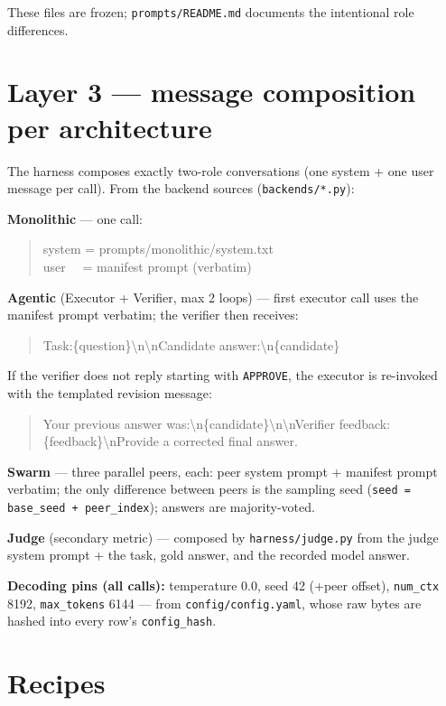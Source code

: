 \documentclass[11pt]{article}
\newcommand{\field}[1]{\texttt{#1}}
\begin{document}
These files are frozen; \texttt{prompts/README.md} documents the intentional
role differences.

\section{Layer 3 --- message composition per architecture}

The harness composes exactly two-role conversations (one system + one user
message per call). From the backend sources (\texttt{backends/*.py}):

\textbf{Monolithic} --- one call:
\begin{quote}\ttfamily\small
system = prompts/monolithic/system.txt\\
user \ \ = manifest prompt (verbatim)
\end{quote}

\textbf{Agentic} (Executor + Verifier, max 2 loops) --- first executor call uses the
manifest prompt verbatim; the verifier then receives:
\begin{quote}\ttfamily\small
Task:\{question\}\textbackslash n\textbackslash nCandidate answer:\textbackslash n\{candidate\}
\end{quote}
If the verifier does not reply starting with \texttt{APPROVE}, the executor is
re-invoked with the templated revision message:
\begin{quote}\ttfamily\small
Your previous answer was:\textbackslash n\{candidate\}\textbackslash n\textbackslash nVerifier feedback: \{feedback\}\textbackslash nProvide a corrected final answer.
\end{quote}

\textbf{Swarm} --- three parallel peers, each: peer system prompt + manifest prompt
verbatim; the only difference between peers is the sampling seed
(\texttt{seed = base\_seed + peer\_index}); answers are majority-voted.

\textbf{Judge} (secondary metric) --- composed by \texttt{harness/judge.py} from the
judge system prompt + the task, gold answer, and the recorded model answer.

\textbf{Decoding pins (all calls):} temperature 0.0, seed 42 (+peer offset),
\texttt{num\_ctx} 8192, \texttt{max\_tokens} 6144 --- from
\texttt{config/config.yaml}, whose raw bytes are hashed into every row's
\field{config\_hash}.

\section{Recipes}
\end{document}
